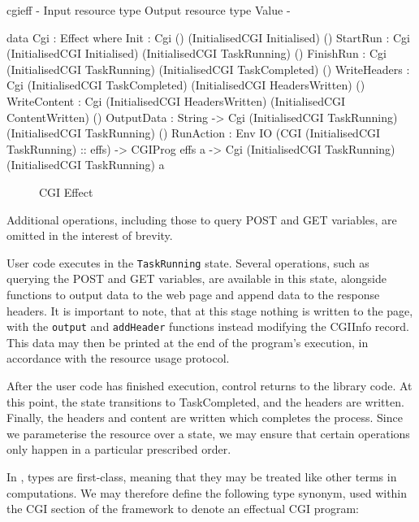 \begin{SaveVerbatim}{cgieff}
{-                     { Input resource type }         { Output resource type }        { Value } -}

data Cgi : Effect where
    Init         : Cgi ()                              (InitialisedCGI Initialised)    ()
    StartRun     : Cgi (InitialisedCGI Initialised)    (InitialisedCGI TaskRunning)    ()
    FinishRun    : Cgi (InitialisedCGI TaskRunning)    (InitialisedCGI TaskCompleted)  ()
    WriteHeaders : Cgi (InitialisedCGI TaskCompleted)  (InitialisedCGI HeadersWritten) ()
    WriteContent : Cgi (InitialisedCGI HeadersWritten) (InitialisedCGI ContentWritten) ()
    OutputData   : String -> 
                   Cgi (InitialisedCGI TaskRunning)    (InitialisedCGI TaskRunning)    ()
    RunAction    : Env IO (CGI (InitialisedCGI TaskRunning) :: effs) -> CGIProg effs a -> 
                   Cgi (InitialisedCGI TaskRunning)    (InitialisedCGI TaskRunning)    a
\end{SaveVerbatim}

\begin{figure*}[t]
\begin{center}
\end{center}
\caption{CGI Effect}
\label{fig:cgieffect}
\end{figure*}

Additional operations, including those to query POST and GET variables, are
omitted in the interest of brevity.

User code executes in the \texttt{TaskRunning} state. Several operations, such
as querying the POST and GET variables, are available in this state, alongside
functions to output data to the web page and append data to the response
headers. It is important to note, that at this stage nothing is written to the
page, with the \texttt{output} and \texttt{addHeader} functions instead
modifying the CGIInfo record. This data may then be printed at the end of the
program's execution, in accordance with the resource usage protocol.

After the user code has finished execution, control returns to the library
code. At this point, the state transitions to TaskCompleted, and the headers
are written.  Finally, the headers and content are written which completes the
process. Since we parameterise the resource over a state, we may ensure that
certain operations only happen in a particular prescribed order.

In \idris{}, types are first-class, meaning that they may be treated like other
terms in computations. We may therefore define the following type synonym, used within the CGI section of the framework to denote an effectual CGI program: 

